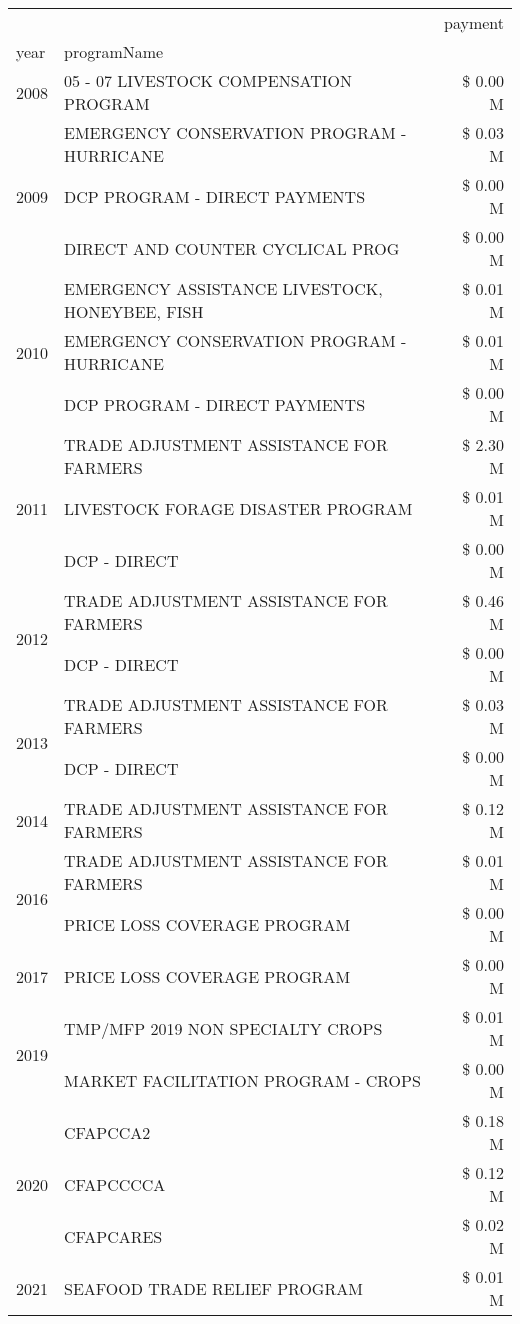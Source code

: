 \begin{tabular}{llr}
\toprule
 &  & payment \\
year & programName &  \\
\midrule
2008 & 05 - 07 LIVESTOCK COMPENSATION PROGRAM & \$ 0.00 M \\
\cline{1-3}
\multirow[t]{3}{*}{2009} & EMERGENCY CONSERVATION PROGRAM - HURRICANE & \$ 0.03 M \\
 & DCP PROGRAM - DIRECT PAYMENTS & \$ 0.00 M \\
 & DIRECT AND COUNTER CYCLICAL PROG & \$ 0.00 M \\
\cline{1-3}
\multirow[t]{3}{*}{2010} & EMERGENCY ASSISTANCE LIVESTOCK, HONEYBEE, FISH & \$ 0.01 M \\
 & EMERGENCY CONSERVATION PROGRAM - HURRICANE & \$ 0.01 M \\
 & DCP PROGRAM - DIRECT PAYMENTS & \$ 0.00 M \\
\cline{1-3}
\multirow[t]{3}{*}{2011} & TRADE ADJUSTMENT ASSISTANCE FOR FARMERS & \$ 2.30 M \\
 & LIVESTOCK FORAGE DISASTER PROGRAM & \$ 0.01 M \\
 & DCP - DIRECT & \$ 0.00 M \\
\cline{1-3}
\multirow[t]{2}{*}{2012} & TRADE ADJUSTMENT ASSISTANCE FOR FARMERS & \$ 0.46 M \\
 & DCP - DIRECT & \$ 0.00 M \\
\cline{1-3}
\multirow[t]{2}{*}{2013} & TRADE ADJUSTMENT ASSISTANCE FOR FARMERS & \$ 0.03 M \\
 & DCP - DIRECT & \$ 0.00 M \\
\cline{1-3}
2014 & TRADE ADJUSTMENT ASSISTANCE FOR FARMERS & \$ 0.12 M \\
\cline{1-3}
\multirow[t]{2}{*}{2016} & TRADE ADJUSTMENT ASSISTANCE FOR FARMERS & \$ 0.01 M \\
 & PRICE LOSS COVERAGE PROGRAM & \$ 0.00 M \\
\cline{1-3}
2017 & PRICE LOSS COVERAGE PROGRAM & \$ 0.00 M \\
\cline{1-3}
\multirow[t]{2}{*}{2019} & TMP/MFP 2019 NON SPECIALTY CROPS & \$ 0.01 M \\
 & MARKET FACILITATION PROGRAM - CROPS & \$ 0.00 M \\
\cline{1-3}
\multirow[t]{3}{*}{2020} & CFAPCCA2 & \$ 0.18 M \\
 & CFAPCCCCA & \$ 0.12 M \\
 & CFAPCARES & \$ 0.02 M \\
\cline{1-3}
2021 & SEAFOOD TRADE RELIEF PROGRAM & \$ 0.01 M \\
\cline{1-3}
\bottomrule
\end{tabular}
